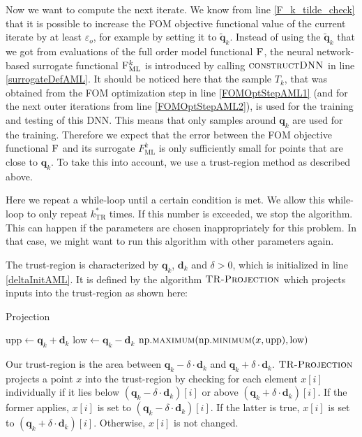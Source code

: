Now we want to compute the next iterate. We know from line \ref{F_k_tilde_check} that it is possible to increase the FOM objective functional value of the current iterate by at least $\varepsilon_o$, for example by setting it to $\tilde{\mathbf{q}}_k$. Instead of using the $\tilde{\mathbf{q}}_k$ that we got from evaluations of the full order model functional $\textproc{F}$, the neural network-based surrogate functional $\textproc{F$_\mathrm{ML}^k$}$ is introduced by calling $\textproc{constructDNN}$ in line \ref{surrogateDefAML}. It should be noticed here that the sample $T_k$, that was obtained from the FOM optimization step in line \ref{FOMOptStepAML1} (and for the next outer iterations from line \ref{FOMOptStepAML2}), is used for the training and testing of this DNN. This means that only samples around $\mathbf{q}_k$ are used for the training. Therefore we expect that the error between the FOM objective functional $\textproc{F}$ and its surrogate $F_\mathrm{ML}^k$ is only sufficiently small for points that are close to $\mathbf{q}_k$. To take this into account, we use a trust-region method as described above.

Here we repeat a while-loop until a certain condition is met. We allow this while-loop to only repeat $k^*_\mathrm{TR}$ times. If this number is exceeded, we stop the algorithm. This can happen if the parameters are chosen inappropriately for this problem. In that case, we might want to run this algorithm with other parameters again.

The trust-region is characterized by $\mathbf{q}_k$, $\mathbf{d}_k$ and $\delta>0$, which is initialized in line \ref{deltaInitAML}. It is defined by the algorithm $\textproc{TR-Projection}$ which projects inputs into the trust-region as shown here:
 
 \begin{algorithm}[H]%
\caption{\label{projectionAlg}Projection}
\begin{algorithmic}[1]
\State $\mathrm{upp}\gets\mathbf{q}_k+\mathbf{d}_k$
\State $\mathrm{low}\gets\mathbf{q}_k-\mathbf{d}_k$
\State \Return $\mathrm{np.}\Call{maximum}{\mathrm{np.}\protect\Call{minimum}{x,\mathrm{upp}},\mathrm{low}}$
\EndFunction
\end{algorithmic}
\end{algorithm}

Our trust-region is the area between $\mathbf{q}_k-\delta\cdot\mathbf{d}_k$ and $\mathbf{q}_k+\delta\cdot\mathbf{d}_k$. $\textproc{TR-Projection}$ projects a point $x$ into the trust-region by checking for each element $x[i]$ individually if it lies below $(\mathbf{q}_k-\delta\cdot\mathbf{d}_k)[i]$ or above $(\mathbf{q}_k+\delta\cdot\mathbf{d}_k)[i]$. If the former applies, $x[i]$ is set to $(\mathbf{q}_k-\delta\cdot\mathbf{d}_k)[i]$. If the latter is true, $x[i]$ is set to $(\mathbf{q}_k+\delta\cdot\mathbf{d}_k)[i]$. Otherwise, $x[i]$ is not changed.

